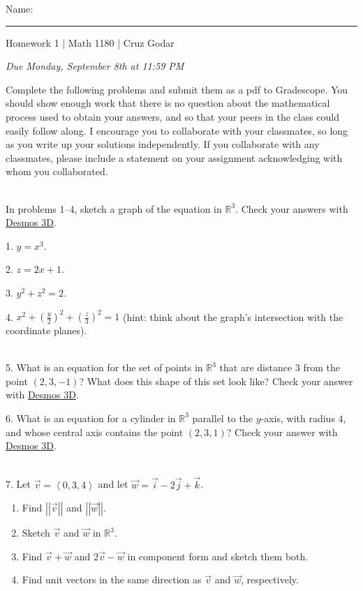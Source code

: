 \documentclass{article}
\begin{document}
\Large Name: \rule{2in}{0.15mm} \hfill Homework 1 | Math 1180 | Cruz Godar \vspace{4pt}  \normalsize

\textit{Due Monday, September 8th at 11:59 PM}

Complete the following problems and submit them as a pdf to Gradescope. You should show enough work that there is no question about the mathematical process used to obtain your answers, and so that your peers in the class could easily follow along. I encourage you to collaborate with your classmates, so long as you write up your solutions independently. If you collaborate with any classmates, please include a statement on your assignment acknowledging with whom you collaborated.

~\\

In problems 1--4, sketch a graph of the equation in $\mathbb{R}^3$. Check your answers with \href{https://www.desmos.com/3d}{Desmos 3D}.

1. $\displaystyle y = x^3$.

2. $\displaystyle z = 2x + 1$.

3. $\displaystyle y^2 + z^2 = 2$.

4. $\displaystyle x^2 + \left( \frac{y}{2} \right)^2 + \left( \frac{z}{3} \right)^2 = 1$ (hint: think about the graph's intersection with the coordinate planes).

~\\

5. What is an equation for the set of points in $\mathbb{R}^3$ that are distance $3$ from the point $(2, 3, -1)$? What does this shape of this set look like? Check your answer with \href{https://www.desmos.com/3d}{Desmos 3D}.

6. What is an equation for a cylinder in $\mathbb{R}^3$ parallel to the $y$-axis, with radius $4$, and whose central axis contains the point $(2, 3, 1)$? Check your answer with \href{https://www.desmos.com/3d}{Desmos 3D}.

~\\

7. Let $\vec{v} = \left< 0, 3, 4 \right>$ and let $\vec{w} = \vec{i} - 2\vec{j} + \vec{k}$.

\begin{enumerate}

	\item Find $\left| \left| \vec{v} \right| \right|$ and $\left| \left| \vec{w} \right| \right|$.

	\item Sketch $\vec{v}$ and $\vec{w}$ in $\mathbb{R}^3$.

	\item Find $\vec{v} + \vec{w}$ and $2\vec{v} - \vec{w}$ in component form and sketch them both.

	\item Find unit vectors in the same direction as $\vec{v}$ and $\vec{w}$, respectively.

\end{enumerate}
\end{document}
